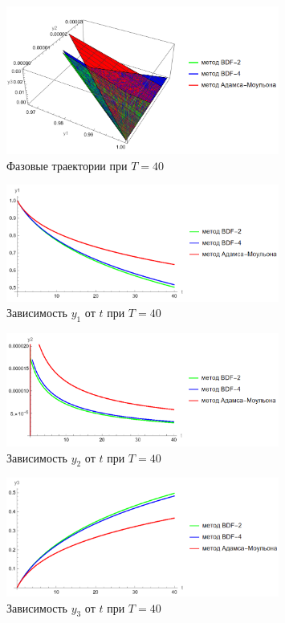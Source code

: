 \documentclass[12pt, a4paper]{article}
\begin{document}
\begin{figure}[!htbp]
	\centering
	\includegraphics[width=0.8\textwidth]{T40-0}%
	\caption{Фазовые траектории при $T = 40$}
	\vspace*{-2mm}
	\label{T40-0}
\end{figure}
\begin{figure}[!htbp]
	\centering
	\includegraphics[width=0.8\textwidth]{T40-1}%
	\caption{Зависимость $y_1$ от $t$ при $T = 40$}
	\vspace*{-2mm}
	\label{T40-1}
\end{figure}
\begin{figure}[!htbp]
	\centering
	\includegraphics[width=0.8\textwidth]{T40-2}%
	\caption{Зависимость $y_2$ от $t$ при $T = 40$}
	\vspace*{-2mm}
	\label{T40-2}
\end{figure}
\begin{figure}[!htbp]
	\centering
	\includegraphics[width=0.8\textwidth]{T40-3}%
	\caption{Зависимость $y_3$ от $t$ при $T = 40$}
	\vspace*{-2mm}
	\label{T40-3}
\end{figure}
\end{document}
